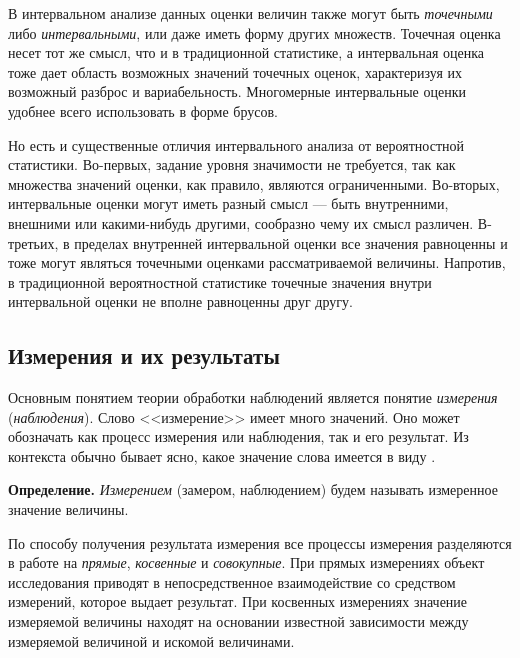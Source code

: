 \documentclass[a5paper,openany]{book}
\begin{document}
{В интервальном анализе данных оценки величин также могут быть \emph{точечными} 
либо \emph{интервальными}, или даже иметь форму других множеств. Точечная оценка 
несет тот же смысл, что и в традиционной статистике, а интервальная оценка тоже дает 
область возможных значений точечных оценок, характеризуя их возможный разброс и 
вариабельность. Многомерные интервальные оценки удобнее всего использовать в форме брусов. 

Но есть и существенные отличия интервального анализа от вероятностной статистики. 
Во-первых, задание уровня  значимости не требуется, так как множества значений оценки, как правило, являются ограниченными. 
Во-вторых, интервальные оценки могут иметь разный смысл --- быть внутренними, 
внешними или какими-нибудь другими, сообразно чему их смысл различен. 
В-третьих, в пределах внутренней интервальной оценки все значения равноценны и тоже могут являться точечными оценками рассматриваемой величины. 
Напротив, в традиционной вероятностной статистике точечные значения внутри интервальной 
оценки не вполне равноценны друг другу. 

\subsection{Измерения и их результаты} 
\label{MeasuResultSect}


	Основным понятием теории обработки наблюдений является понятие \emph{измерения} (\emph{наблюдения}). Слово <<измерение>> имеет много значений. Оно может 
обозначать как процесс измерения или наблюдения, так и его результат. Из контекста обычно 
бывает ясно, какое значение слова имеется в виду \cite{MetodikaBook}.  

{\bf Определение.}
	\textsl{Измерением} (замером, наблюдением) будем называть измеренное значение величины. 

По способу получения результата измерения все процессы измерения разделяются 
в работе \cite{Malikov} на \emph{прямые}, \emph{косвенные} и \emph{совокупные}. 
При прямых измерениях объект исследования приводят в непосредственное взаимодействие 
со средством измерений, которое выдает результат.   
При косвенных измерениях значение измеряемой величины находят на основании  
известной зависимости между измеряемой величиной и искомой величинами. 

}
\end{document}
